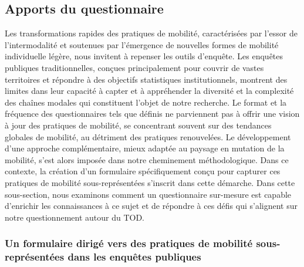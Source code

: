 \begin{refsegment}
\subsection{Apports du questionnaire
    \label{chap3:apports-questionnaire-usagers}
    }

Les transformations rapides des pratiques de mobilité, caractérisées par l’essor de l’intermodalité et soutenues par l’émergence de nouvelles formes de mobilité individuelle légère, nous invitent à repenser les outils d’enquête. Les enquêtes publiques traditionnelles, conçues principalement pour couvrir de vastes territoires et répondre à des objectifs statistiques institutionnels, montrent des limites dans leur capacité à capter et à appréhender la diversité et la complexité des chaînes modales qui constituent l’objet de notre recherche. Le format et la fréquence des questionnaires tels que définis ne parviennent pas à offrir une vision à jour des pratiques de mobilité, se concentrant souvent sur des tendances globales de mobilité, au détriment des pratiques renouvelées. Le développement d’une approche complémentaire, mieux adaptée au paysage en mutation de la mobilité, s’est alors imposée dans notre cheminement méthodologique. Dans ce contexte, la création d’un formulaire spécifiquement conçu pour capturer ces pratiques de mobilité sous-représentées s’inscrit dans cette démarche. Dans cette sous-section, nous examinons comment un questionnaire sur-mesure est capable d'enrichir les connaissances à ce sujet et de répondre à ces défis qui s'alignent sur notre questionnement autour du \acrshort{TOD}.%

\subsubsection*{Un formulaire dirigé vers des pratiques de mobilité sous-représentées dans les enquêtes publiques
    \label{chap3:apports-questionnaire-usagers-limites-enquetes-traditionnelles}
    }


\end{refsegment}
